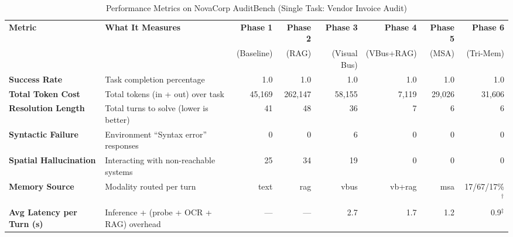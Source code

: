 \documentclass[conference]{IEEEtran}
\begin{document}
\begin{table}[!t]
    \centering
    \caption{Performance Metrics on NovaCorp AuditBench (Single Task: Vendor Invoice Audit)}
    \label{tab:metrics}
    \begin{tabularx}{\textwidth}{@{} l X r r r r r r @{}}
        \toprule
        \textbf{Metric}                   & \textbf{What It Measures}                        & \textbf{Phase 1} & \textbf{Phase 2} & \textbf{Phase 3} & \textbf{Phase 4} & \textbf{Phase 5} & \textbf{Phase 6}       \\
                                          &                                                  & (Baseline)       & (RAG)            & (Visual Bus)     & (VBus+RAG)       & (MSA)            & (Tri-Mem)              \\
        \midrule
        \textbf{Success Rate}             & Task completion percentage                       & 1.0              & 1.0              & 1.0              & 1.0              & 1.0              & 1.0                    \\
        \textbf{Total Token Cost}         & Total tokens (in + out) over task                & 45,169           & 262,147          & 58,155           & 7,119            & 29,026           & 31,606                 \\
        \textbf{Resolution Length}        & Total turns to solve (lower is better)           & 41               & 48               & 36               & 7                & 6                & 6                      \\
        \textbf{Syntactic Failure}        & Environment ``Syntax error'' responses           & 0                & 0                & 6                & 0                & 0                & 0                      \\
        \textbf{Spatial Hallucination}    & Interacting with non-reachable systems           & 25               & 34               & 19               & 0                & 0                & 0                      \\
        \textbf{Memory Source}            & Modality routed per turn                         & text             & rag              & vbus             & vb+rag           & msa              & 17/67/17\%$^{\dagger}$ \\
        \textbf{Avg Latency per Turn (s)} & Inference + (probe + OCR + RAG) overhead         & ---              & ---              & 2.7              & 1.7              & 1.2              & 0.9$^{\ddagger}$       \\

\end{tabularx}
\end{table}
\end{document}
